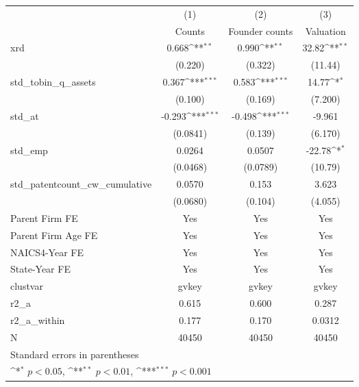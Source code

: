 {
\def\sym#1{\ifmmode^{#1}\else\(^{#1}\)\fi}
\begin{tabular}{l*{3}{c}}
\hline\hline
            &\multicolumn{1}{c}{(1)}&\multicolumn{1}{c}{(2)}&\multicolumn{1}{c}{(3)}\\
            &\multicolumn{1}{c}{Counts}&\multicolumn{1}{c}{Founder counts}&\multicolumn{1}{c}{Valuation}\\
\hline
xrd         &       0.668\sym{**} &       0.990\sym{**} &       32.82\sym{**} \\
            &     (0.220)         &     (0.322)         &     (11.44)         \\
[1em]
std\_tobin\_q\_assets&       0.367\sym{***}&       0.583\sym{***}&       14.77\sym{*}  \\
            &     (0.100)         &     (0.169)         &     (7.200)         \\
[1em]
std\_at      &      -0.293\sym{***}&      -0.498\sym{***}&      -9.961         \\
            &    (0.0841)         &     (0.139)         &     (6.170)         \\
[1em]
std\_emp     &      0.0264         &      0.0507         &      -22.78\sym{*}  \\
            &    (0.0468)         &    (0.0789)         &     (10.79)         \\
[1em]
std\_patentcount\_cw\_cumulative&      0.0570         &       0.153         &       3.623         \\
            &    (0.0680)         &     (0.104)         &     (4.055)         \\
[1em]
Parent Firm FE&         Yes         &         Yes         &         Yes         \\
[1em]
Parent Firm Age FE&         Yes         &         Yes         &         Yes         \\
[1em]
NAICS4-Year FE&         Yes         &         Yes         &         Yes         \\
[1em]
State-Year FE&         Yes         &         Yes         &         Yes         \\
\hline
clustvar    &       gvkey         &       gvkey         &       gvkey         \\
r2\_a        &       0.615         &       0.600         &       0.287         \\
r2\_a\_within &       0.177         &       0.170         &      0.0312         \\
N           &       40450         &       40450         &       40450         \\
\hline\hline
\multicolumn{4}{l}{\footnotesize Standard errors in parentheses}\\
\multicolumn{4}{l}{\footnotesize \sym{*} \(p<0.05\), \sym{**} \(p<0.01\), \sym{***} \(p<0.001\)}\\
\end{tabular}
}
